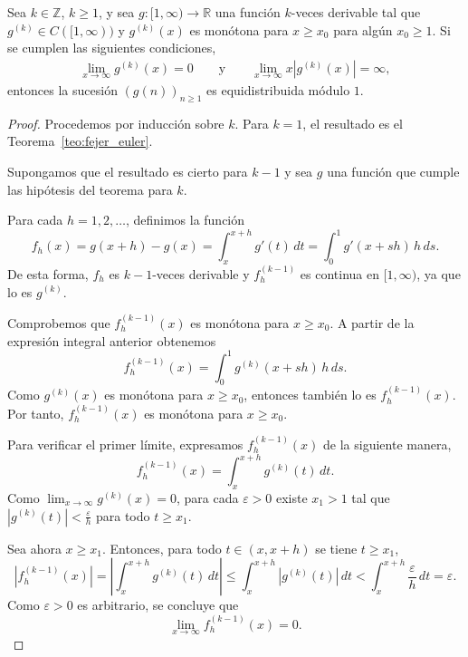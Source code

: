 \begin{theorem}
    \label{teo:fejer_cap4}
    Sea $k\in \mathbb{Z}$, $k \geq 1$, y sea $g:[1,\infty) \to \mathbb{R}$ una función
    $k$-veces derivable tal que $g^{(k)}\in C([1,\infty))$ y $g^{(k)}(x)$ es monótona
    para $x \geq x_0$ para algún $x_0 \geq 1$. Si se cumplen las siguientes condiciones,
    \begin{align}
        \label{hipo:fejer_cap4}
        \lim_{x \to \infty} g^{(k)}(x) = 0
        \qquad \text{y} \qquad
        \lim_{x \to \infty} {x \left|g^{(k)}(x)\right|} = \infty,
    \end{align}
    entonces la sucesión $(g(n))_{n\geq1}$ es equidistribuida módulo $1$.
\end{theorem}

\begin{proof}
    Procedemos por inducción sobre $k$. Para $k=1$, el resultado es el Teorema~\ref{teo:fejer_euler}.

    Supongamos que el resultado es cierto para $k-1$ y sea $g$ una función que cumple
    las hipótesis del teorema para $k$.

    Para cada $h=1,2,\dots$, definimos la función 
    \[
    f_h(x) = g(x+h) - g(x)=\int_x^{x+h}g'(t)\,dt=\int_0^1g'(x+sh)\,h\,ds.
    \]
    De esta forma, $f_h$ es $k-1$-veces derivable y $f_h^{(k-1)}$ es continua en $[1,\infty)$, ya que lo es $g^{(k)}$.
    
    
    Comprobemos que $f_h^{(k-1)}(x)$ es monótona para $x \geq x_0$. A partir 
    de la expresión integral anterior obtenemos
    \[
        f_h^{(k-1)}(x) = 
        \int_0^1g^{(k)}(x+sh)\,h\,ds.
    \] 
    Como $g^{(k)}(x)$ es monótona para $x \geq x_0$, entonces también lo es $f_h^{(k-1)}(x)$. Por tanto, $f_h^{(k-1)}(x)$ es monótona para $x \geq x_0$.

    Para verificar el primer límite, expresamos $f_h^{(k-1)}(x)$ de la siguiente manera, 
    \[
        f_h^{(k-1)}(x) = \int_x^{x+h} g^{(k)}(t) \, dt.
    \]
    Como $\lim_{x \to \infty} g^{(k)}(x) = 0$, para cada $\varepsilon > 0$ existe $x_1 > 1$
    tal que $\left|g^{(k)}(t)\right| < \frac{\varepsilon}{h}$ para todo $t \geq x_1$. 
    
    Sea ahora $x \geq x_1$. Entonces, para todo $t \in (x,x+h)$ se tiene $t \geq x_1$,
    \[
        \left|f_h^{(k-1)}(x)\right| = 
        \left|\int_x^{x+h} g^{(k)}(t) \, dt\right| \leq 
        \int_x^{x+h} |g^{(k)}(t)| \, dt < 
        \int_x^{x+h} \frac{\varepsilon}{h} \, dt = \varepsilon.
    \]
    Como $\varepsilon > 0$ es arbitrario, se concluye que 
    \[
        \lim_{x \to \infty} f_h^{(k-1)}(x) = 0.
    \]
    

\end{proof}
